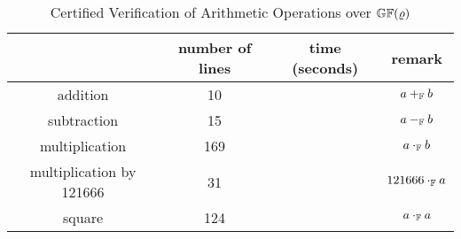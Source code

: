\begin{table}[ht]
  \caption{Certified Verification of Arithmetic Operations over
    $\mathbb{GF}(\varrho)$}
  \centering
  \begin{tabular}{|c|c|c|c|}
    \hline
             & number of lines & time (seconds) & remark\\
    \hline
    addition & 10 &                       & $a +_{\mathbb{F}} b$ \\
    \hline
    subtraction & 15 &                    & $a -_{\mathbb{F}} b$ \\
    \hline
    multiplication & 169 &                & $a \cdot_{\mathbb{F}} b$\\
    \hline
    multiplication by 121666 & 31 &       & $121666 \cdot_{\mathbb{F}} a$\\
    \hline
    square & 124 &                        & $a \cdot_{\mathbb{F}} a$\\
    \hline
  \end{tabular}
  \label{table:arithmetic-operations}
\end{table}

